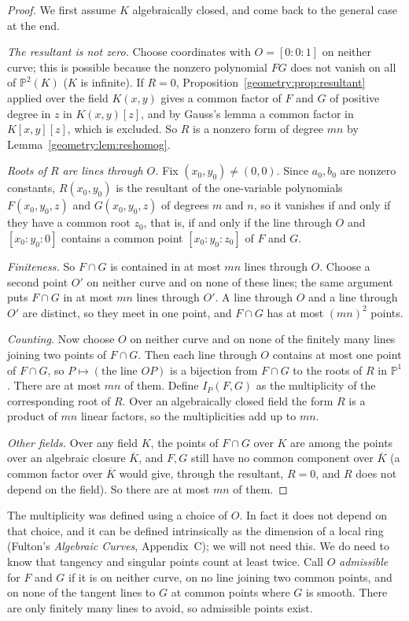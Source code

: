 \begin{proof}
We first assume $K$ algebraically closed, and come back to the general case at the end.

\emph{The resultant is not zero.} Choose coordinates with $O=[0:0:1]$ on neither curve; this is possible because the nonzero polynomial $FG$ does not
vanish on all of $\mathbb P^2(K)$ ($K$ is infinite). If $R=0$, Proposition~\ref{geometry:prop:resultant} applied over the field $K(x,y)$ gives a common factor of
$F$ and $G$ of positive degree in $z$ in $K(x,y)[z]$, and by Gauss's lemma a common factor in $K[x,y][z]$, which is excluded. So $R$ is a nonzero form of
degree $mn$ by Lemma~\ref{geometry:lem:reshomog}.

\emph{Roots of $R$ are lines through $O$.} Fix $(x_0,y_0)\ne(0,0)$. Since $a_0,b_0$ are nonzero constants, $R(x_0,y_0)$ is the resultant of the
one-variable polynomials $F(x_0,y_0,z)$ and $G(x_0,y_0,z)$ of degrees $m$ and $n$, so it vanishes if and only if they have a common root $z_0$, that is, if and only
if the line through $O$ and $[x_0:y_0:0]$ contains a common point $[x_0:y_0:z_0]$ of $F$ and $G$.

\emph{Finiteness.} So $F\cap G$ is contained in at most $mn$ lines through $O$. Choose a second point $O'$ on neither curve and on none of these lines;
the same argument puts $F\cap G$ in at most $mn$ lines through $O'$. A line through $O$ and a line through $O'$ are distinct, so they meet in one point, and
$F\cap G$ has at most $(mn)^2$ points.

\emph{Counting.} Now choose $O$ on neither curve and on none of the finitely many lines joining two points of $F\cap G$. Then each line through $O$
contains at most one point of $F\cap G$, so $P\mapsto(\text{the line }OP)$ is a bijection from $F\cap G$ to the roots of $R$ in $\mathbb P^1$. There are at
most $mn$ of them. Define $I_P(F,G)$ as the multiplicity of the corresponding root of $R$. Over an algebraically closed field the form $R$ is a product of
$mn$ linear factors, so the multiplicities add up to $mn$.

\emph{Other fields.} Over any field $K$, the points of $F\cap G$ over $K$ are among the points over an algebraic closure $\overline K$,
and $F,G$ still have no common component over $\overline K$ (a common factor over $\overline K$ would give, through the resultant, $R=0$, and $R$ does not
depend on the field). So there are at most $mn$ of them.
\end{proof}

The multiplicity was defined using a choice of $O$. In fact it does not depend on that choice, and it can be defined intrinsically as the dimension of a
local ring (Fulton's \emph{Algebraic Curves}, Appendix~C); we will not need this. We do need to know that tangency and singular points count at least twice.
Call $O$ \emph{admissible} for $F$ and $G$ if it is on neither curve, on no line joining two common points, and on none of the tangent lines to $G$ at
common points where $G$ is smooth. There are only finitely many lines to avoid, so admissible points exist.

